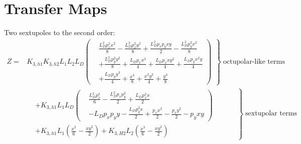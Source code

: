 \section{Transfer Maps}

Two sextupoles to the second order:
\footnotesize
\begin{equation}
    \begin{aligned}
      Z = &\left.
      K_{3,h1} K_{3,h2} L_{1} L_{2} L_{D} \left(
      \begin{aligned}
        &\frac{L_{D}^{2} p_{x}^{2} x^{2}}{8} - \frac{L_{D}^{2} p_{x}^{2} y^{2}}{8} + \frac{L_{D}^{2} p_{x} p_{y} x y}{2} - \frac{L_{D}^{2} p_{y}^{2} x^{2}}{8} \\
        &+ \frac{L_{D}^{2} p_{y}^{2} y^{2}}{8} + \frac{L_{D} p_{x} x^{3}}{4} + \frac{L_{D} p_{x} x y^{2}}{4} + \frac{L_{D} p_{y} x^{2} y}{4} \\
        &+ \frac{L_{D} p_{y} y^{3}}{4} + \frac{x^{4}}{8} + \frac{x^{2} y^{2}}{4} + \frac{y^{4}}{8}
      \end{aligned} \right) \;\,\right\} \; \text{octupolar-like terms}\\
      & \left.
      \begin{aligned}
        &+ K_{3,h1} L_{1} L_{D} \left(
        \begin{aligned}
          &\frac{L_{D}^{2} p_{x}^{3}}{6} - \frac{L_{D}^{2} p_{x} p_{y}^{2}}{2} + \frac{L_{D} p_{x}^{2} x}{2} \\
          &- L_{D} p_{x} p_{y} y - \frac{L_{D} p_{y}^{2} x}{2} + \frac{p_{x} x^{2}}{2} - \frac{p_{x} y^{2}}{2} - p_{y} x y
        \end{aligned}\right)\\
        &+ K_{3,h1} L_{1} \left(\frac{x^{3}}{6} - \frac{x y^{2}}{2}\right) + K_{3,H2} L_{2} \left(\frac{x^{3}}{6} - \frac{x y^{2}}{2}\right)
      \end{aligned}
      \qquad\quad\right\} \; \text{sextupolar terms}
    \end{aligned}
\end{equation}
\normalsize



